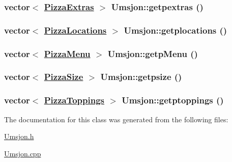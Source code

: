 \hypertarget{class_umsjon_48a5a2fa53cb3c40c681bd053598876b}{
\subsubsection[getpextras]{\setlength{\rightskip}{0pt plus 5cm}vector$<$ \hyperlink{class_pizza_extras}{Pizza\-Extras} $>$ Umsjon::getpextras ()}}
\label{class_umsjon_48a5a2fa53cb3c40c681bd053598876b}


\hypertarget{class_umsjon_a84f9abb849190a11dfcb3f0d5d619cc}{
\subsubsection[getplocations]{\setlength{\rightskip}{0pt plus 5cm}vector$<$ \hyperlink{class_pizza_locations}{Pizza\-Locations} $>$ Umsjon::getplocations ()}}
\label{class_umsjon_a84f9abb849190a11dfcb3f0d5d619cc}


\hypertarget{class_umsjon_729f51349769ff866a7cf5d79d381c2b}{
\subsubsection[getpMenu]{\setlength{\rightskip}{0pt plus 5cm}vector$<$ \hyperlink{class_pizza_menu}{Pizza\-Menu} $>$ Umsjon::getp\-Menu ()}}
\label{class_umsjon_729f51349769ff866a7cf5d79d381c2b}


\hypertarget{class_umsjon_fffa683bcf55b44d751ab146b21b3ae9}{
\subsubsection[getpsize]{\setlength{\rightskip}{0pt plus 5cm}vector$<$ \hyperlink{class_pizza_size}{Pizza\-Size} $>$ Umsjon::getpsize ()}}
\label{class_umsjon_fffa683bcf55b44d751ab146b21b3ae9}


\hypertarget{class_umsjon_63e370dface20065bb6dde6d38ea4287}{
\subsubsection[getptoppings]{\setlength{\rightskip}{0pt plus 5cm}vector$<$ \hyperlink{class_pizza_toppings}{Pizza\-Toppings} $>$ Umsjon::getptoppings ()}}
\label{class_umsjon_63e370dface20065bb6dde6d38ea4287}




The documentation for this class was generated from the following files:\begin{CompactItemize}
\item 
\hyperlink{_umsjon_8h}{Umsjon.h}\item 
\hyperlink{_umsjon_8cpp}{Umsjon.cpp}\end{CompactItemize}

